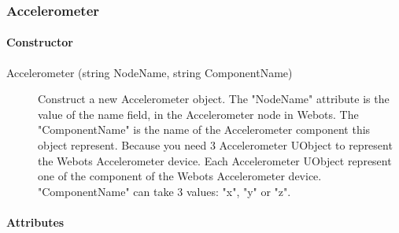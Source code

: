 \subsubsection{Accelerometer}
\label{webots.uobjects.robotdevices.accelerometer}%

\paragraph{Constructor}
\label{webots.uobjects.robotdevices.accelerometer.constructor}%

\noindent
\begin{description}
\item[{Accelerometer (string NodeName, string ComponentName)}]
  Construct a new Accelerometer object.  The "NodeName" attribute is
  the value of the name field, in the Accelerometer node in Webots.
  The "ComponentName" is the name of the Accelerometer component this
  object represent.  Because you need 3 Accelerometer UObject to
  represent the Webots Accelerometer device. Each Accelerometer
  UObject represent one of the component of the Webots Accelerometer
  device.  "ComponentName" can take 3 values: "x", "y" or "z".

\end{description}

\paragraph{Attributes}
\label{webots.uobjects.robotdevices.accelerometer.attributes}%

